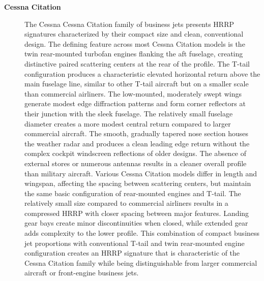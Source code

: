 {\begin{description}
    \item[\textbf{Cessna Citation}]
    The Cessna Cessna Citation family of business jets presents HRRP signatures characterized by their compact size and clean, conventional design. The defining feature across most Cessna Citation models is the twin rear-mounted turbofan engines flanking the aft fuselage, creating distinctive paired scattering centers at the rear of the profile. The T-tail configuration produces a characteristic elevated horizontal return above the main fuselage line, similar to other T-tail aircraft but on a smaller scale than commercial airliners. The low-mounted, moderately swept wings generate modest edge diffraction patterns and form corner reflectors at their junction with the sleek fuselage. The relatively small fuselage diameter creates a more modest central return compared to larger commercial aircraft. The smooth, gradually tapered nose section houses the weather radar and produces a clean leading edge return without the complex cockpit windscreen reflections of older designs. The absence of external stores or numerous antennas results in a cleaner overall profile than military aircraft. Various Cessna Citation models differ in length and wingspan, affecting the spacing between scattering centers, but maintain the same basic configuration of rear-mounted engines and T-tail. The relatively small size compared to commercial airliners results in a compressed HRRP with closer spacing between major features. Landing gear bays create minor discontinuities when closed, while extended gear adds complexity to the lower profile. This combination of compact business jet proportions with conventional T-tail and twin rear-mounted engine configuration creates an HRRP signature that is characteristic of the Cessna Citation family while being distinguishable from larger commercial aircraft or front-engine business jets.

\end{description}}

